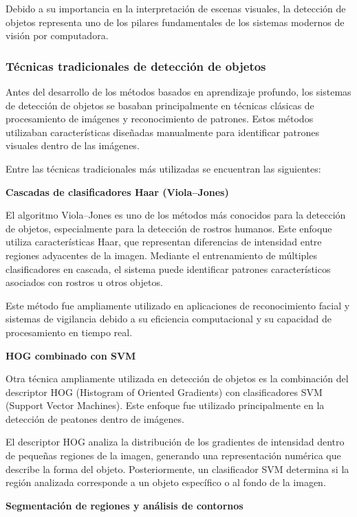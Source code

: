 Debido a su importancia en la interpretación de escenas visuales, la detección de objetos representa uno de los pilares fundamentales de los sistemas modernos de visión por computadora.

\subsubsection{Técnicas tradicionales de detección de objetos}
Antes del desarrollo de los métodos basados en aprendizaje profundo, los sistemas de detección de objetos se basaban principalmente en técnicas clásicas de procesamiento de imágenes y reconocimiento de patrones. Estos métodos utilizaban características diseñadas manualmente para identificar patrones visuales dentro de las imágenes.

Entre las técnicas tradicionales más utilizadas se encuentran las siguientes:

\textbf{Cascadas de clasificadores Haar (Viola–Jones)}

El algoritmo Viola–Jones es uno de los métodos más conocidos para la detección de objetos, especialmente para la detección de rostros humanos. Este enfoque utiliza características Haar, que representan diferencias de intensidad entre regiones adyacentes de la imagen. Mediante el entrenamiento de múltiples clasificadores en cascada, el sistema puede identificar patrones característicos asociados con rostros u otros objetos\cite{viola2001detection}.

Este método fue ampliamente utilizado en aplicaciones de reconocimiento facial y sistemas de vigilancia debido a su eficiencia computacional y su capacidad de procesamiento en tiempo real.

\textbf{HOG combinado con SVM}

Otra técnica ampliamente utilizada en detección de objetos es la combinación del descriptor HOG (Histogram of Oriented Gradients) con clasificadores SVM (Support Vector Machines). Este enfoque fue utilizado principalmente en la detección de peatones dentro de imágenes.

El descriptor HOG analiza la distribución de los gradientes de intensidad dentro de pequeñas regiones de la imagen, generando una representación numérica que describe la forma del objeto. Posteriormente, un clasificador SVM determina si la región analizada corresponde a un objeto específico o al fondo de la imagen\cite{dalal2005hog}.

\textbf{Segmentación de regiones y análisis de contornos}

